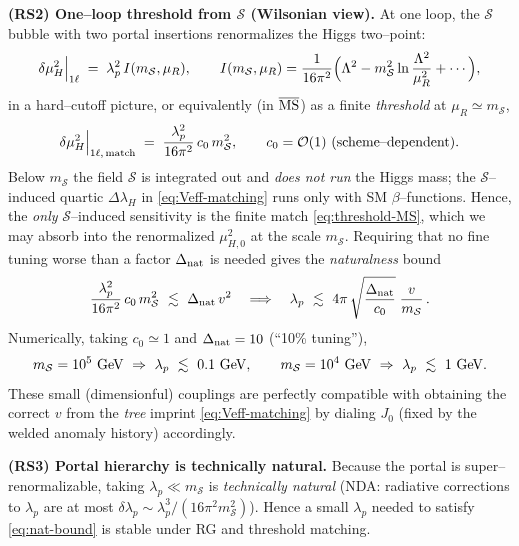 \documentclass[10pt]{article}
\theoremstyle{definition}
\theoremstyle{plain}
\begin{document}
\medskip
\noindent\textbf{(RS2) One–loop threshold from $\mathcal S$ (Wilsonian view).}
At one loop, the $\mathcal S$ bubble with two portal insertions renormalizes the Higgs two–point:
\[
\delta\mu_H^2\Big|_{\rm 1\ell}\;=\;\lambda_p^2\,I(m_{\mathcal S},\mu_R),\qquad
I(m_{\mathcal S},\mu_R)
=\frac{1}{16\pi^2}\Big(\Lambda^2-m_{\mathcal S}^2\ln\frac{\Lambda^2}{\mu_R^2}+\cdots\Big),
\]
in a hard–cutoff picture, or equivalently (in $\overline{\rm MS}$) as a finite \emph{threshold} at $\mu_R\simeq m_{\mathcal S}$,
\begin{equation}
\label{eq:threshold-MS}
\delta\mu_H^2\Big|_{\rm 1\ell,\,match}\;=\;\frac{\lambda_p^2}{16\pi^2}\,c_0\,m_{\mathcal S}^2,
\qquad c_0=\mathcal O(1)\ \text{(scheme–dependent)}.
\end{equation}
Below $m_{\mathcal S}$ the field $\mathcal S$ is integrated out and \emph{does not run} the Higgs mass; the
$\mathcal S$–induced quartic $\Delta\lambda_H$ in \eqref{eq:Veff-matching} runs only with SM $\beta$–functions.
Hence, the \emph{only} $\mathcal S$–induced sensitivity is the finite match \eqref{eq:threshold-MS}, which we may absorb
into the renormalized $\mu_{H,0}^2$ at the scale $m_{\mathcal S}$. Requiring that no fine tuning worse than a factor
$\Delta_{\rm nat}$ is needed gives the \emph{naturalness} bound
\begin{equation}
\label{eq:nat-bound}
\frac{\lambda_p^2}{16\pi^2}\,c_0\,m_{\mathcal S}^2\ \lesssim\ \Delta_{\rm nat}\,v^2
\quad\Longrightarrow\quad
\lambda_p\ \lesssim\ 4\pi\,\sqrt{\frac{\Delta_{\rm nat}}{c_0}}\;\frac{v}{m_{\mathcal S}}\,.
\end{equation}
Numerically, taking $c_0\simeq 1$ and $\Delta_{\rm nat}=10$ (``10\% tuning''),
\[
m_{\mathcal S}=10^5~{\rm GeV}\ \Rightarrow\ \lambda_p\ \lesssim\ 0.1~{\rm GeV},\qquad
m_{\mathcal S}=10^4~{\rm GeV}\ \Rightarrow\ \lambda_p\ \lesssim\ 1~{\rm GeV}.
\]
These small (dimensionful) couplings are perfectly compatible with obtaining the correct $v$ from the \emph{tree} imprint
\eqref{eq:Veff-matching} by dialing $J_0$ (fixed by the welded anomaly history) accordingly.

\medskip
\noindent\textbf{(RS3) Portal hierarchy is technically natural.}
Because the portal is super–renormalizable, taking $\lambda_p \ll m_{\mathcal S}$ is \emph{technically natural}
(NDA: radiative corrections to $\lambda_p$ are at most $\delta\lambda_p\sim \lambda_p^3/(16\pi^2 m_{\mathcal S}^2)$).
Hence a small $\lambda_p$ needed to satisfy \eqref{eq:nat-bound} is stable under RG and threshold matching.
\end{document}
